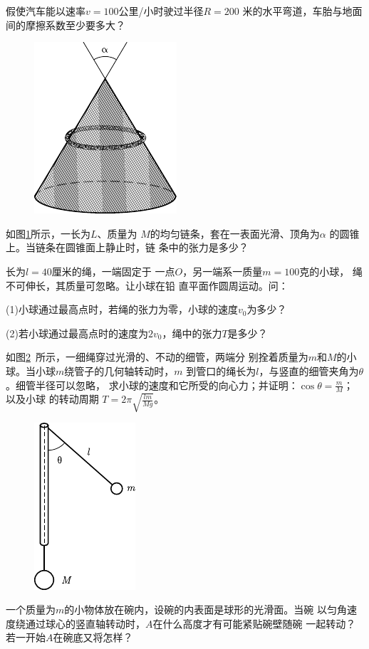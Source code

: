 \begin{exercises}
\exercise 假使汽车能以速率$  v = 1 0 0  $公里/小时驶过半径$  R = 2 0 0  $
米的水平弯道，车胎与地面间的摩擦系数至少要多大？

\begin{figure}
	\centering
	\includegraphics{figure/fig03.33}
	\caption{}
	\label{fig:03.33}
\end{figure}
\exercise 如图\ref{fig:03.33}所示，一长为$ L $、质量为
$ M $的均匀链条，套在一表面光滑、顶角为$ \alpha $
的圆锥上。当链条在圆锥面上静止时，链
条中的张力是多少？

\exercise 长为$  l = 4 0  $厘米的绳，一端固定于
一点$ O $，另一端系一质量$  m = 1 0 0  $克的小球，
绳不可伸长，其质量可忽略。让小球在铅
直平面作圆周运动。问：

(1)小球通过最高点时，若绳的张力为零，小球的速度$  v _ { 0 }  $为多少？

(2)若小球通过最高点时的速度为$  2 v _ { 0 }  $，绳中的张力$ T $是多少？

\exercise 如图\ref{fig:03.34}~所示，一细绳穿过光滑的、不动的细管，两端分
别拴着质量为$ m $和$ M $的小球。当小球$ m $绕管子的几何轴转动时，$ m $
到管口的绳长为$ l $，与竖直的细管夹角为$ \theta $。细管半径可以忽略，
求小球的速度和它所受的向心力；并证明：$  \cos \theta = \frac { m } { M }  $； 以及小球
的转动周期
$ T = 2 \pi \sqrt{\frac { l m } { M g }}  $。

\begin{figure}
	\centering
	\includegraphics{figure/fig03.34}
	\caption{}
	\label{fig:03.34}
\end{figure}
\exercise 一个质量为$ m $的小物体放在碗内，设碗的内表面是球形的光滑面。当碗
以匀角速度绕通过球心的竖直轴转动时，$ A $在什么高度才有可能紧贴碗壁随碗
一起转动？若一开始$ A $在碗底又将怎样？


\end{exercises}
